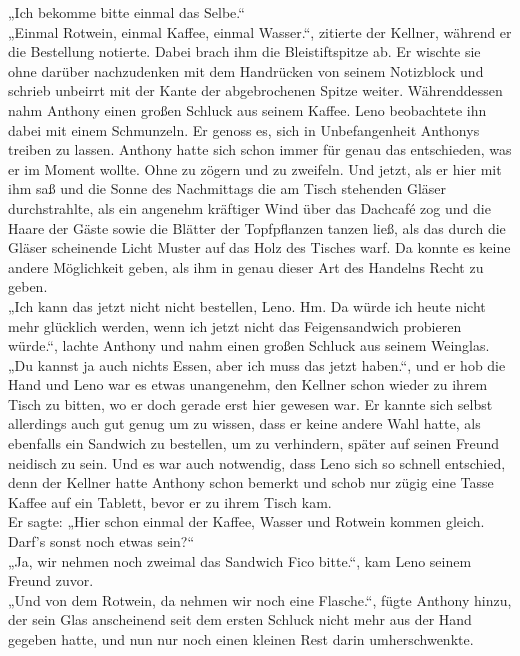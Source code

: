 \documentclass[ngerman,smalldemyvopaper,11pt,oneside,onecolumn,openright,extrafontsizes]{memoir}
\begin{document}
„Ich bekomme bitte einmal das Selbe.“
\vspace{0.5em} \\
„Einmal Rotwein, einmal Kaffee, einmal Wasser.“, zitierte der Kellner, während er die Bestellung notierte. Dabei brach ihm die Bleistiftspitze ab. Er wischte sie ohne darüber nachzudenken mit dem Handrücken von seinem Notizblock und schrieb unbeirrt mit der Kante der abgebrochenen Spitze weiter. Währenddessen nahm Anthony einen großen Schluck aus seinem Kaffee.
Leno beobachtete ihn dabei mit einem Schmunzeln. Er genoss es, sich in Unbefangenheit Anthonys treiben zu lassen. Anthony hatte sich schon immer für genau das entschieden, was er im Moment wollte. Ohne zu zögern und zu zweifeln. Und jetzt, als er hier mit ihm saß und die Sonne des Nachmittags die am Tisch stehenden Gläser durchstrahlte, als ein angenehm kräftiger Wind über das Dachcafé zog und die Haare der Gäste sowie die Blätter der Topfpflanzen tanzen ließ, als das durch die Gläser scheinende Licht Muster auf das Holz des Tisches warf. Da konnte es keine andere Möglichkeit geben, als ihm in genau dieser Art des Handelns Recht zu geben.
\vspace{0.5em} \\
„Ich kann das jetzt nicht nicht bestellen, Leno. Hm. Da würde ich heute nicht mehr glücklich werden, wenn ich jetzt nicht das Feigensandwich probieren würde.“, lachte Anthony und nahm einen großen Schluck aus seinem Weinglas. „Du kannst ja auch nichts Essen, aber ich muss das jetzt haben.“, und er hob die Hand und Leno war es etwas unangenehm, den Kellner schon wieder zu ihrem Tisch zu bitten, wo er doch gerade erst hier gewesen war. Er kannte sich selbst allerdings auch gut genug um zu wissen, dass er keine andere Wahl hatte, als ebenfalls ein Sandwich zu bestellen, um zu verhindern, später auf seinen Freund neidisch zu sein. Und es war auch notwendig, dass Leno sich so schnell entschied, denn der Kellner hatte Anthony schon bemerkt und schob nur zügig eine Tasse Kaffee auf ein Tablett, bevor er zu ihrem Tisch kam.
\vspace{0.5em} \\
Er sagte: „Hier schon einmal der Kaffee, Wasser und Rotwein kommen gleich. Darf's sonst noch etwas sein?“
\vspace{0.5em} \\
„Ja, wir nehmen noch zweimal das Sandwich Fico bitte.“, kam Leno seinem Freund zuvor.
\vspace{0.5em} \\
„Und von dem Rotwein, da nehmen wir noch eine Flasche.“, fügte Anthony hinzu, der sein Glas anscheinend seit dem ersten Schluck nicht mehr aus der Hand gegeben hatte, und nun nur noch einen kleinen Rest darin umherschwenkte.
\end{document}
